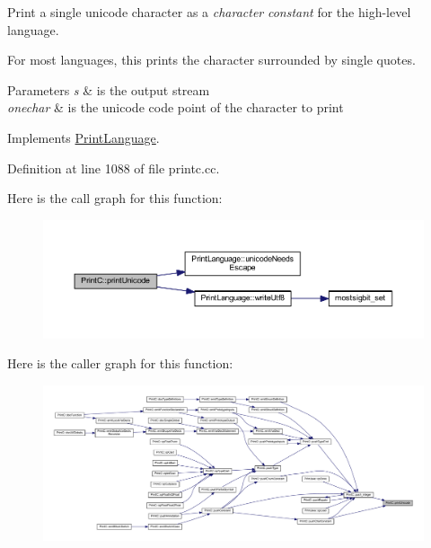Print a single unicode character as a {\itshape character} {\itshape constant} for the high-\/level language. 

For most languages, this prints the character surrounded by single quotes. 
\begin{DoxyParams}{Parameters}
{\em s} & is the output stream \\
\hline
{\em onechar} & is the unicode code point of the character to print \\
\hline
\end{DoxyParams}


Implements \mbox{\hyperlink{class_print_language_acfc5f922cf2befcad9b38ef1d55c35e3}{Print\+Language}}.



Definition at line 1088 of file printc.\+cc.

Here is the call graph for this function\+:
\nopagebreak
\begin{figure}[H]
\begin{center}
\leavevmode
\includegraphics[width=350pt]{class_print_c_a56fdbb426ff8dda0d3dd29901f09ead1_cgraph}
\end{center}
\end{figure}
Here is the caller graph for this function\+:
\nopagebreak
\begin{figure}[H]
\begin{center}
\leavevmode
\includegraphics[width=350pt]{class_print_c_a56fdbb426ff8dda0d3dd29901f09ead1_icgraph}
\end{center}
\end{figure}
\mbox{\label{class_print_c_a5770972840193a1f118925fbb92fa4b2}} 
